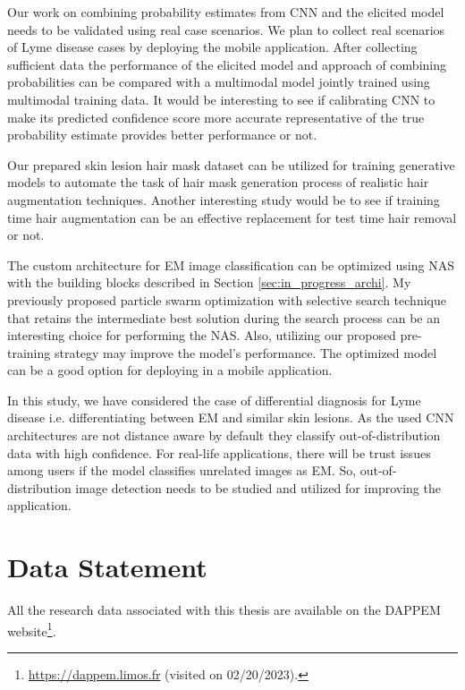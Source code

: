 Our work on combining probability estimates from CNN and the elicited model needs to be validated using real case scenarios. We plan to collect real scenarios of Lyme disease cases by deploying the mobile application. After collecting sufficient data the performance of the elicited model and approach of combining probabilities can be compared with a multimodal model jointly trained using multimodal training data. It would be interesting to see if calibrating CNN \cite{CalibrationRef} to make its predicted confidence score more accurate representative of the true probability estimate provides better performance or not. 

Our prepared skin lesion hair mask dataset can be utilized for training generative models to automate the task of hair mask generation process of realistic hair augmentation techniques. Another interesting study would be to see if training time hair augmentation can be an effective replacement for test time hair removal or not.

The custom architecture for EM image classification can be optimized using NAS with the building blocks described in Section \ref{sec:in_progress_archi}. My previously proposed particle swarm optimization with selective search technique  that retains the intermediate best solution during the search process can be an interesting choice for performing the NAS. Also, utilizing our proposed pre-training strategy may improve the model's performance. The optimized model can be a good option for deploying in a mobile application.

In this study, we have considered the case of differential diagnosis for Lyme disease i.e. differentiating between EM and similar skin lesions. As the used CNN architectures are not distance aware by default they classify out-of-distribution data with high confidence. For real-life applications, there will be trust issues among users if the model classifies unrelated images as EM. So, out-of-distribution image detection \cite{Hsu2020OOD, NEURIPS2020_543e8374, Yang2021OOD} needs to be studied and utilized for improving the application.
\section{Data Statement}
All the research data associated with this thesis are available on the DAPPEM website\footnote{\url{https://dappem.limos.fr} (visited on 02/20/2023).}.

